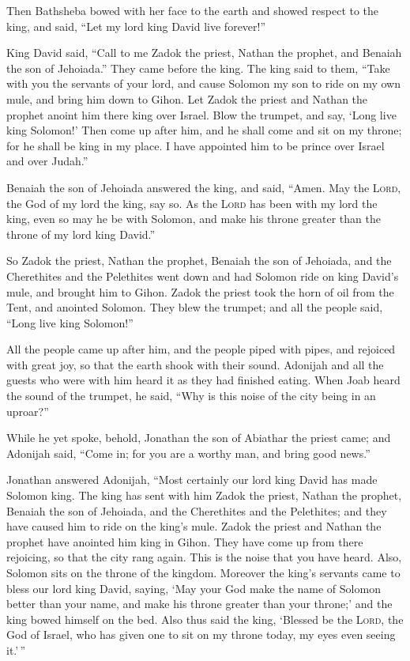  Then Bathsheba bowed with her face to the earth and
showed respect to the king, and said, ``Let my lord king David live
forever!''

 King David said, ``Call to me Zadok the priest, Nathan
the prophet, and Benaiah the son of Jehoiada.'' They came before the
king.  The king said to them, ``Take with you the
servants of your lord, and cause Solomon my son to ride on my own mule,
and bring him down to Gihon.  Let Zadok the priest and
Nathan the prophet anoint him there king over Israel. Blow the trumpet,
and say, `Long live king Solomon!'  Then come up after
him, and he shall come and sit on my throne; for he shall be king in my
place. I have appointed him to be prince over Israel and over Judah.''

 Benaiah the son of Jehoiada answered the king, and said,
``Amen. May the \textsc{Lord}, the God of my lord the king, say so.
 As the \textsc{Lord} has been with my lord the king,
even so may he be with Solomon, and make his throne greater than the
throne of my lord king David.''

 So Zadok the priest, Nathan the prophet, Benaiah the son
of Jehoiada, and the Cherethites and the Pelethites went down and had
Solomon ride on king David's mule, and brought him to Gihon.
 Zadok the priest took the horn of oil from the Tent, and
anointed Solomon. They blew the trumpet; and all the people said, ``Long
live king Solomon!''

 All the people came up after him, and the people piped
with pipes, and rejoiced with great joy, so that the earth shook with
their sound.  Adonijah and all the guests who were with
him heard it as they had finished eating. When Joab heard the sound of
the trumpet, he said, ``Why is this noise of the city being in an
uproar?''

 While he yet spoke, behold, Jonathan the son of Abiathar
the priest came; and Adonijah said, ``Come in; for you are a worthy man,
and bring good news.''

 Jonathan answered Adonijah, ``Most certainly our lord
king David has made Solomon king.  The king has sent with
him Zadok the priest, Nathan the prophet, Benaiah the son of Jehoiada,
and the Cherethites and the Pelethites; and they have caused him to ride
on the king's mule.  Zadok the priest and Nathan the
prophet have anointed him king in Gihon. They have come up from there
rejoicing, so that the city rang again. This is the noise that you have
heard.  Also, Solomon sits on the throne of the kingdom.
 Moreover the king's servants came to bless our lord king
David, saying, `May your God make the name of Solomon better than your
name, and make his throne greater than your throne;' and the king bowed
himself on the bed.  Also thus said the king, `Blessed be
the \textsc{Lord}, the God of Israel, who has given one to sit on my
throne today, my eyes even seeing it.'\,''

